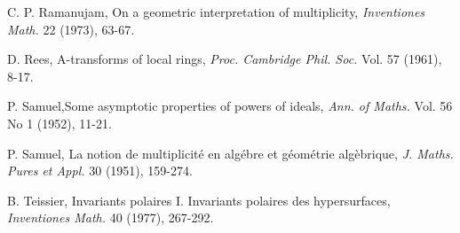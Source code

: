 \begin{thebibliography}{99}
 C. P. Ramanujam, On a geometric interpretation of multiplicity, {\em Inventiones Math.} 22 (1973), 63-67.

 D. Rees, A-transforms of local rings, {\em Proc. Cambridge Phil. Soc. } Vol. 57 (1961), 8-17.

 P. Samuel,\pageoriginale Some asymptotic properties of powers of ideals, {\em Ann. of Maths. } Vol. 56 No 1 (1952), 11-21.

 P. Samuel, La notion de multiplicit\'e en alg\'ebre et g\'eom\'etrie alg\`ebrique, {\em J. Maths. Pures et Appl. } 30 (1951), 159-274.

 B. Teissier, Invariants polaires I. Invariants polaires des hypersurfaces, {\em Inventiones Math.} 40 (1977), 267-292.

\end{thebibliography}

